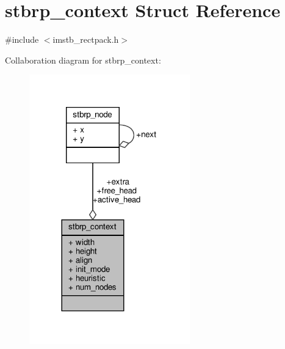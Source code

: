 \hypertarget{structstbrp__context}{}\section{stbrp\+\_\+context Struct Reference}
\label{structstbrp__context}


{\ttfamily \#include $<$imstb\+\_\+rectpack.\+h$>$}



Collaboration diagram for stbrp\+\_\+context\+:
\nopagebreak
\begin{figure}[H]
\begin{center}
\leavevmode
\includegraphics[width=197pt]{structstbrp__context__coll__graph}
\end{center}
\end{figure}
